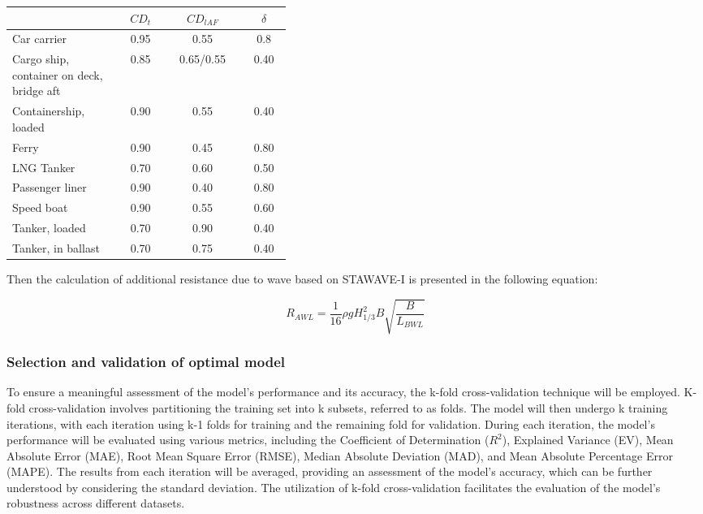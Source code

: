 \documentclass[]{interact}
\theoremstyle{plain}%
\theoremstyle{definition}
\theoremstyle{remark}
\begin{document}
\begin{table}
  {\begin{tabular}{ p{0.4\linewidth} c c c }
  \hline
  &\textbf{$CD_t$} & \textbf{$CD_{lAF}$} & \textbf{$\delta$} \\
  \hline
  Car carrier & 0.95 & 0.55 & 0.8 \\
  Cargo ship, container on deck, bridge aft & 0.85 & 0.65/0.55 & 0.40 \\
  Containership, loaded & 0.90 & 0.55 & 0.40 \\
  Ferry & 0.90 & 0.45 & 0.80\\
  LNG Tanker & 0.70 & 0.60 & 0.50 \\
  Passenger liner & 0.90 & 0.40 & 0.80 \\
  Speed boat & 0.90 & 0.55 & 0.60 \\
  Tanker, loaded & 0.70 & 0.90 & 0.40 \\
  Tanker, in ballast & 0.70 & 0.75 & 0.40 \\
  \hline        
  \end{tabular}}
  \label{tbl:BlendermannCoeff}
\end{table}

Then the calculation of additional resistance due to wave based on STAWAVE-I is presented in the following equation:

\begin{equation}
  \label{eqn:stawave1}
  R_{AWL} = \frac{1}{16}\rho g H_{1/3}^2 B \sqrt{\frac{B}{L_{BWL}}} 
\end{equation}

\subsubsection{Selection and validation of optimal model}\label{sec:select_and_val_model}

To ensure a meaningful assessment of the model's performance and its accuracy, the k-fold cross-validation technique will be employed. K-fold cross-validation involves partitioning the training set into k subsets, referred to as folds. The model will then undergo k training iterations, with each iteration using k-1 folds for training and the remaining fold for validation. During each iteration, the model's performance will be evaluated using various metrics, including the Coefficient of Determination ($R^2$), Explained Variance (EV), Mean Absolute Error (MAE), Root Mean Square Error (RMSE), Median Absolute Deviation (MAD), and Mean Absolute Percentage Error (MAPE). The results from each iteration will be averaged, providing an assessment of the model's accuracy, which can be further understood by considering the standard deviation. The utilization of k-fold cross-validation facilitates the evaluation of the model's robustness across different datasets.
\end{document}
